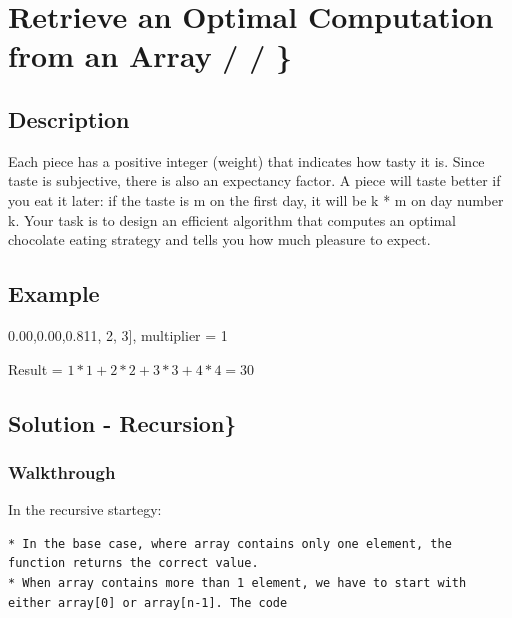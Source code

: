 \documentclass[]{book}
\newenvironment{Shaded}{\begin{snugshade}}{\end{snugshade}}
\newcommand{\DecValTok}[1]{\textcolor[rgb]{0.00,0.00,0.81}{#1}}
\newcommand{\NormalTok}[1]{#1}
\begin{document}
\hypertarget{retrieve-an-optimal-computation-from-an-array}{%
\section{Retrieve an Optimal Computation from an Array / / \}}\label{retrieve-an-optimal-computation-from-an-array}}

\hypertarget{description-38}{%
\subsection{Description}\label{description-38}}

Each piece has a positive integer (weight) that indicates how tasty it is. Since taste is subjective, there is also an
expectancy factor. A piece will taste better if you eat it later: if the taste is m on the first day, it
will be k * m on day number k. Your task is to design an efficient algorithm that computes an optimal chocolate eating
strategy and tells you how much pleasure to expect.

\hypertarget{example-37}{%
\subsection{Example}\label{example-37}}

\begin{Shaded}
\begin{Highlighting}[]
\NormalTok{[}\DecValTok{1}\NormalTok{, }\DecValTok{2}\NormalTok{, }\DecValTok{3}\NormalTok{], multiplier = }\DecValTok{1}
\end{Highlighting}
\end{Shaded}

Result = \(1 * 1 + 2 * 2 + 3 * 3 + 4 * 4= 30\)

\hypertarget{solution---recursion}{%
\subsection{Solution - Recursion\}}\label{solution---recursion}}

\hypertarget{walkthrough-37}{%
\subsubsection{Walkthrough}\label{walkthrough-37}}

In the recursive startegy:

\begin{verbatim}
* In the base case, where array contains only one element, the function returns the correct value.
* When array contains more than 1 element, we have to start with either array[0] or array[n-1]. The code
\end{verbatim}
\end{document}
